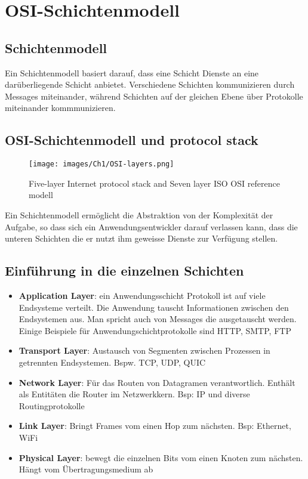 \section{OSI-Schichtenmodell}

\subsection{Schichtenmodell}
Ein Schichtenmodell basiert darauf, dass eine Schicht Dienste an eine darüberliegende Schicht anbietet. Verschiedene Schichten kommunizieren durch Messages miteinander, während Schichten auf der gleichen Ebene über Protokolle miteinander kommmunizieren.


\subsection{OSI-Schichtenmodell und protocol stack}
\begin{figure}[H]
    \centering
    \texttt{[image: images/Ch1/OSI-layers.png]}
    \caption{Five-layer Internet protocol stack and Seven layer ISO OSI reference modell}
\end{figure}
Ein Schichtenmodell ermöglicht die Abstraktion von der Komplexität der Aufgabe, so dass sich ein Anwendungsentwickler darauf verlassen kann, dass die unteren Schichten die er nutzt ihm geweisse Dienste zur Verfügung stellen.

\subsection{Einführung in die einzelnen Schichten}
\begin{itemize}
    \item \textbf{Application Layer}: ein Anwendungsschicht Protokoll ist auf viele Endsysteme verteilt. Die Anwendung tauscht Informationen zwischen den Endsystemen aus. Man spricht auch von Messages die ausgetauscht werden. Einige Beispiele für Anwendungschichtprotokolle sind HTTP, SMTP, FTP
    \item \textbf{Transport Layer}: Austausch von Segmenten zwischen Prozessen in getrennten Endsystemen. Bspw. TCP, UDP, QUIC
    \item \textbf{Network Layer}: Für das Routen von Datagramen verantwortlich. Enthält als Entitäten die Router im Netzwerkkern. Bsp: IP und diverse Routingprotokolle
    \item \textbf{Link Layer}: Bringt Frames vom einen Hop zum nächsten. Bsp: Ethernet, WiFi
    \item \textbf{Physical Layer}: bewegt die einzelnen Bits vom einen Knoten zum nächsten. Hängt vom Übertragungsmedium ab
\end{itemize}

